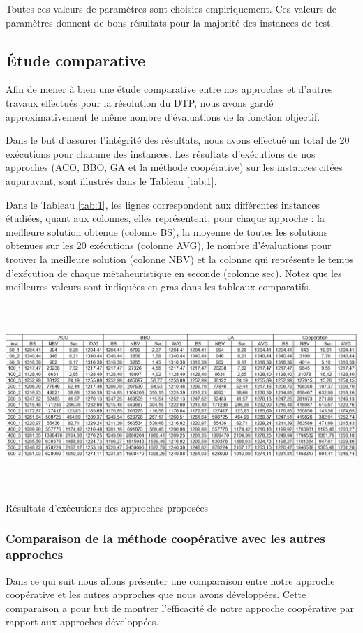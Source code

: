 Toutes ces valeurs de paramètres sont choisies empiriquement. Ces valeurs de paramètres donnent de bons résultats pour la majorité des instances de test.

\subsection{Étude comparative}
Afin de mener à bien une étude comparative entre nos approches et d’autres travaux effectués pour la résolution du DTP, nous avons gardé approximativement le même nombre d’évaluations de la fonction objectif.

Dans le but d’assurer l’intégrité des résultats, nous avons effectué un total de 20 exécutions pour chacune des instances. Les résultats d’exécutions de nos approches (ACO, BBO, GA et la méthode coopérative) sur les instances citées auparavant, sont illustrés dans le Tableau \ref{tab:1}.

Dans le Tableau  \ref{tab:1}, les lignes correspondent aux différentes instances étudiées, quant aux colonnes, elles représentent, pour chaque approche : la meilleure solution obtenue (colonne BS), la moyenne de toutes les solutions obtenues sur  les 20 exécutions (colonne AVG), le nombre d’évaluations pour trouver la meilleure solution  (colonne NBV) et la colonne qui représente le temps d’exécution de chaque métaheuristique en seconde (colonne sec). 
Notez que les meilleures valeurs sont indiquées en gras dans les tableaux comparatifs.


\begin{table}[H]
	\includegraphics[width=17cm,height=7cm]{Chap5/t1.png}
	\caption{Résultats d’exécutions des  approches proposées}
	\label{tab:1}
\end{table}


\subsubsection{Comparaison de la méthode coopérative avec les autres approches}
Dans ce qui suit nous allons présenter une comparaison entre notre approche coopérative et les autres approches que nous avons développées. Cette comparaison a pour but de montrer l’efficacité de notre approche coopérative par rapport aux approches développées. 

